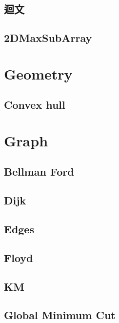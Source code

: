     \subsection{迴文}
        
    \subsection{2DMaxSubArray}
        

\section{Geometry}
    \subsection{Convex hull}
        

\section{Graph}
    \subsection{Bellman Ford}
        
    \subsection{Dijk}
        
    \subsection{Edges}
            
    \subsection{Floyd}
        
    \subsection{KM}
        
    \subsection{Global Minimum Cut}
        
